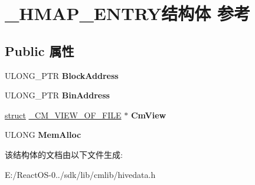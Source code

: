 \hypertarget{struct___h_m_a_p___e_n_t_r_y}{}\section{\+\_\+\+H\+M\+A\+P\+\_\+\+E\+N\+T\+R\+Y结构体 参考}
\label{struct___h_m_a_p___e_n_t_r_y}
\subsection*{Public 属性}
\begin{DoxyCompactItemize}
\item 
\mbox{\label{struct___h_m_a_p___e_n_t_r_y_a242de93040596486b5b4e5a73f288d6d}} 
U\+L\+O\+N\+G\+\_\+\+P\+TR {\bfseries Block\+Address}
\item 
\mbox{\label{struct___h_m_a_p___e_n_t_r_y_af8666a3b98f0ff657bbbdc7930578763}} 
U\+L\+O\+N\+G\+\_\+\+P\+TR {\bfseries Bin\+Address}
\item 
\mbox{\label{struct___h_m_a_p___e_n_t_r_y_a23b80841c2d853ee2bdd61d52fe0b553}} 
\hyperlink{interfacestruct}{struct} \hyperlink{struct___c_m___v_i_e_w___o_f___f_i_l_e}{\+\_\+\+C\+M\+\_\+\+V\+I\+E\+W\+\_\+\+O\+F\+\_\+\+F\+I\+LE} $\ast$ {\bfseries Cm\+View}
\item 
\mbox{\label{struct___h_m_a_p___e_n_t_r_y_a5080ab178c4d78db84acf47c3befb47e}} 
U\+L\+O\+NG {\bfseries Mem\+Alloc}
\end{DoxyCompactItemize}


该结构体的文档由以下文件生成\+:\begin{DoxyCompactItemize}
\item 
E\+:/\+React\+O\+S-\/0../sdk/lib/cmlib/hivedata.\+h\end{DoxyCompactItemize}
